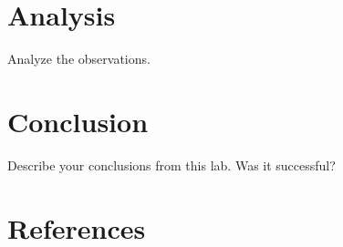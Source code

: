 \documentclass[12pt]{article}
\begin{document}
\section{Analysis}

Analyze the observations.

\section{Conclusion}

Describe your conclusions from this lab.
Was it successful?

\clearpage

\pagebreak
\renewcommand*{\refname}{}
\section{References}
%
%


\end{document}
